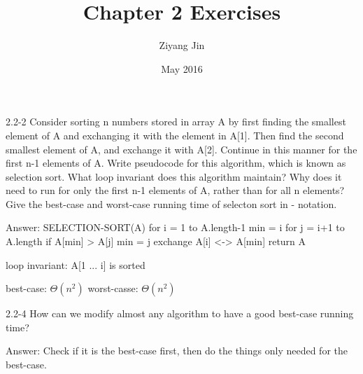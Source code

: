 \documentclass{article}
\title{Chapter 2 Exercises}
\author{Ziyang Jin}
\date{May 2016}
\begin{document}
2.2-2
Consider sorting n numbers stored in array A by first finding the smallest element of A and exchanging it with the element in A[1]. Then find the second  smallest element of A, and exchange it with A[2]. Continue in this manner for the first n-1 elements of A. Write pseudocode for this algorithm, which is known as selection sort. What loop invariant does this algorithm maintain? Why does it need  to run for only the first n-1 elements of A, rather than for all n elements? Give the best-case and worst-case running time of selecton sort in \Theta - notation.

Answer:
\Procedure
SELECTION-SORT(A)
  for i = 1 to A.length-1
    min = i
    for j = i+1 to A.length
      if A[min] > A[j]
        min = j
    exchange A[i] <-> A[min]
  return A
  
loop invariant: A[1 ... i] is sorted
  
best-case: $\Theta(n^2)$
worst-casse: $\Theta(n^2)$
\EndProcedure

2.2-4
How can we modify almost any algorithm to have a good best-case running time?

Answer:
  Check if it is the best-case first, then do the things only needed for the best-case.
\end{document}
